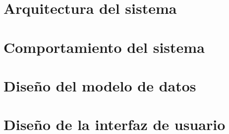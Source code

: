\section{Arquitectura del sistema}
\label{arquitectura_sistema}


\section{Comportamiento del sistema}
\label{comportamiento_sistema}


\section{Diseño del modelo de datos}
\label{diseno_modelo_datos}


\section{Diseño de la interfaz de usuario}
\label{diseno_interfaz_usuario}
